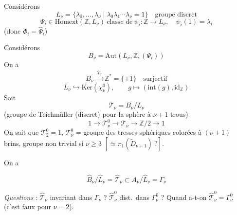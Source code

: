 \documentclass[11pt,a4paper]{article}
\begin{document}
Considérons
\[
  L_{\nu} = \{\lambda_{0}, \dots, \lambda_{\nu} \mid \lambda_{0}\lambda_{1}\cdots\lambda_{\nu} = 1\}
  \quad \text{groupe discret}
\]
\[
  \Psi_{i} \in \mathrm{Homext}(\mathbb{Z}, L_{\nu})\ \text{classe de}\
  \psi_{i} : \mathbb{Z} \to L_{\nu},\quad \psi_{i}(1) = \lambda_{i}
\]
(donc $\Phi_{i} = \widehat{\Psi}_{i}$) \struck{\ill{}}

Considérons
\[
  B_{\nu} = \mathrm{Aut}(L_{\nu}, \mathbb{Z}, (\Psi_{i}))
\]
On a
\[
  B_{\nu} \xrightarrow{\ \chi_{\nu}^{0}\ } \mathbb{Z}^{*} = \{\pm 1\}
  \quad\text{surjectif}
\]
\[
  L_{\nu} \hookrightarrow \mathrm{Ker}(\chi_{\nu}^{0}),\qquad
  g \longmapsto (\mathrm{int}(g), \mathrm{id}_{\mathbb{Z}})
\]
Soit
\[
  \mathcal{T}_{\nu} = B_{\nu}/L_{\nu}
\]
(groupe de Teichmüller (discret)  pour la sphère à $\nu + 1$
trous)
\[
  1 \to \mathcal{T}_{\nu}^{0} \to \mathcal{T}_{\nu} \to \mathbb{Z}/2 \to 1
\]
On sait que $\mathcal{T}_{2}^{0} = 1$,
$\mathcal{T}_{\nu}^{0}$ = groupe des tresses sphériques colorées à $(\nu+1)$
brins, groupe non trivial si $\nu \ge 3$
$[\simeq \pi_{1}(\widetilde{D}_{\nu+1})\ ?]$.

On a


\[
  \widehat{B}_{\nu}/\widehat{L}_{\nu} = \widehat{\mathcal{T}}_{\nu}
  \subset A_{\nu}/\widehat{L}_{\nu} = \Gamma_{\nu}
\]


\emph{Questions} : $\widehat{\mathcal{T}}_{\nu}$ invariant dans
$\Gamma_{\nu}$ ? $\widehat{\mathcal{T}}_{\nu}^{0}$ dist.\ dans
$\Gamma_{\nu}^{0}$ ? Quand a-t-on \struck{\ill{}}
$\widehat{\mathcal{T}}_{\nu}^{0} = \Gamma_{\nu}^{0}$
(c'est faux pour $\nu = 2$).
\end{document}
